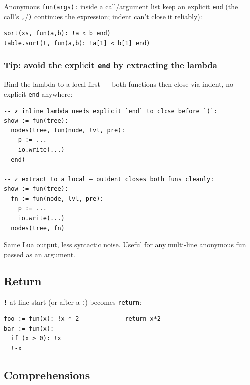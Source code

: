 \documentclass[10pt,twocolumn]{article}
\providecommand{\passthrough}[1]{#1}
\begin{document}
Anonymous \passthrough{\lstinline!fun(args):!} inside a call/argument
list keep an explicit \passthrough{\lstinline!end!} (the call's
\passthrough{\lstinline!,!}/\passthrough{\lstinline!)!} continues the
expression; indent can't close it reliably):

\begin{lstlisting}[language=Fun]
sort(xs, fun(a,b): !a < b end)
table.sort(t, fun(a,b): !a[1] < b[1] end)
\end{lstlisting}

\subsubsection{\texorpdfstring{Tip: avoid the explicit \texttt{end} by
extracting the
lambda}{Tip: avoid the explicit end by extracting the lambda}}\label{tip-avoid-the-explicit-end-by-extracting-the-lambda}

Bind the lambda to a local first --- both functions then close via
indent, no explicit \passthrough{\lstinline!end!} anywhere:

\begin{lstlisting}[language=Fun]
-- ✗ inline lambda needs explicit `end` to close before `)`:
show := fun(tree):
  nodes(tree, fun(node, lvl, pre):
    p := ...
    io.write(...)
  end)

-- ✓ extract to a local — outdent closes both funs cleanly:
show := fun(tree):
  fn := fun(node, lvl, pre):
    p := ...
    io.write(...)
  nodes(tree, fn)
\end{lstlisting}

Same Lua output, less syntactic noise. Useful for any multi-line
anonymous fun passed as an argument.

\subsection{Return}\label{return}

\passthrough{\lstinline"!"} at line start (or after a
\passthrough{\lstinline!:!}) becomes \passthrough{\lstinline!return!}:

\begin{lstlisting}[language=Fun]
foo := fun(x): !x * 2          -- return x*2
bar := fun(x):
  if (x > 0): !x
  !-x
\end{lstlisting}

\subsection{Comprehensions}\label{comprehensions}
\end{document}
